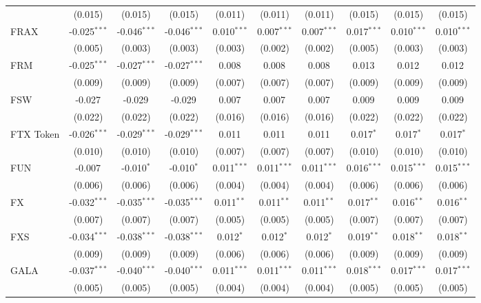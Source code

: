 \begin{table}[!htbp]
\begin{tabular}{@{\extracolsep{5pt}}lccccccccc}
  & (0.015) & (0.015) & (0.015) & (0.011) & (0.011) & (0.011) & (0.015) & (0.015) & (0.015) \\
 FRAX & -0.025$^{***}$ & -0.046$^{***}$ & -0.046$^{***}$ & 0.010$^{***}$ & 0.007$^{***}$ & 0.007$^{***}$ & 0.017$^{***}$ & 0.010$^{***}$ & 0.010$^{***}$ \\
  & (0.005) & (0.003) & (0.003) & (0.003) & (0.002) & (0.002) & (0.005) & (0.003) & (0.003) \\
 FRM & -0.025$^{***}$ & -0.027$^{***}$ & -0.027$^{***}$ & 0.008$^{}$ & 0.008$^{}$ & 0.008$^{}$ & 0.013$^{}$ & 0.012$^{}$ & 0.012$^{}$ \\
  & (0.009) & (0.009) & (0.009) & (0.007) & (0.007) & (0.007) & (0.009) & (0.009) & (0.009) \\
 FSW & -0.027$^{}$ & -0.029$^{}$ & -0.029$^{}$ & 0.007$^{}$ & 0.007$^{}$ & 0.007$^{}$ & 0.009$^{}$ & 0.009$^{}$ & 0.009$^{}$ \\
  & (0.022) & (0.022) & (0.022) & (0.016) & (0.016) & (0.016) & (0.022) & (0.022) & (0.022) \\
 FTX Token & -0.026$^{***}$ & -0.029$^{***}$ & -0.029$^{***}$ & 0.011$^{}$ & 0.011$^{}$ & 0.011$^{}$ & 0.017$^{*}$ & 0.017$^{*}$ & 0.017$^{*}$ \\
  & (0.010) & (0.010) & (0.010) & (0.007) & (0.007) & (0.007) & (0.010) & (0.010) & (0.010) \\
 FUN & -0.007$^{}$ & -0.010$^{*}$ & -0.010$^{*}$ & 0.011$^{***}$ & 0.011$^{***}$ & 0.011$^{***}$ & 0.016$^{***}$ & 0.015$^{***}$ & 0.015$^{***}$ \\
  & (0.006) & (0.006) & (0.006) & (0.004) & (0.004) & (0.004) & (0.006) & (0.006) & (0.006) \\
 FX & -0.032$^{***}$ & -0.035$^{***}$ & -0.035$^{***}$ & 0.011$^{**}$ & 0.011$^{**}$ & 0.011$^{**}$ & 0.017$^{**}$ & 0.016$^{**}$ & 0.016$^{**}$ \\
  & (0.007) & (0.007) & (0.007) & (0.005) & (0.005) & (0.005) & (0.007) & (0.007) & (0.007) \\
 FXS & -0.034$^{***}$ & -0.038$^{***}$ & -0.038$^{***}$ & 0.012$^{*}$ & 0.012$^{*}$ & 0.012$^{*}$ & 0.019$^{**}$ & 0.018$^{**}$ & 0.018$^{**}$ \\
  & (0.009) & (0.009) & (0.009) & (0.006) & (0.006) & (0.006) & (0.009) & (0.009) & (0.009) \\
 GALA & -0.037$^{***}$ & -0.040$^{***}$ & -0.040$^{***}$ & 0.011$^{***}$ & 0.011$^{***}$ & 0.011$^{***}$ & 0.018$^{***}$ & 0.017$^{***}$ & 0.017$^{***}$ \\
  & (0.005) & (0.005) & (0.005) & (0.004) & (0.004) & (0.004) & (0.005) & (0.005) & (0.005) \\

\end{tabular}
\end{table}

